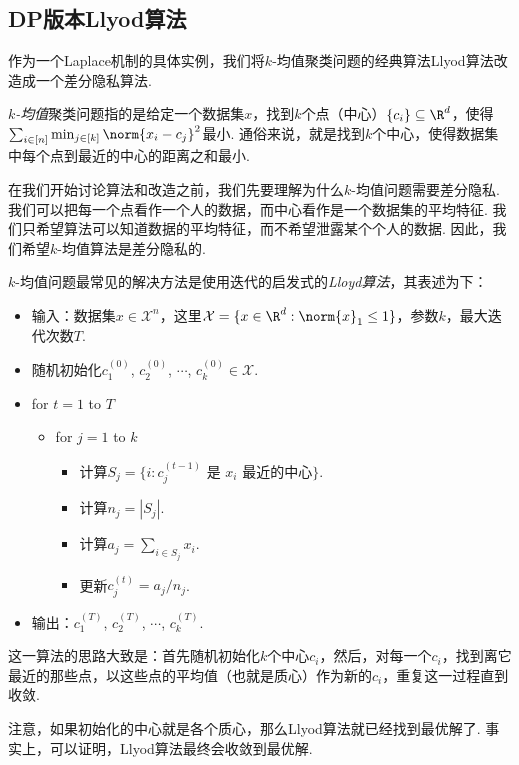 \subsection{DP版本Llyod算法}
作为一个Laplace机制的具体实例，我们将$k$-均值聚类问题的经典算法Llyod算法改造成一个差分隐私算法.

\emph{$k$-均值}聚类问题指的是给定一个数据集$x$，找到$k$个点（中心）$\{c_i\} \subseteq \R^d$，使得$\sum_{i \in [n]} \min_{j\in[k]} \norm{x_i - c_j}^2$最小. 通俗来说，就是找到$k$个中心，使得数据集中每个点到最近的中心的距离之和最小. 

在我们开始讨论算法和改造之前，我们先要理解为什么$k$-均值问题需要差分隐私. 我们可以把每一个点看作一个人的数据，而中心看作是一个数据集的平均特征. 我们只希望算法可以知道数据的平均特征，而不希望泄露某个个人的数据. 因此，我们希望$k$-均值算法是差分隐私的.

$k$-均值问题最常见的解决方法是使用迭代的启发式的\emph{Lloyd算法}，其表述为下：
\begin{itemize}
    \item 输入：数据集$x \in \mathcal X^n$，这里$\mathcal X = \{x \in \R^d : \norm{x}_1 \leq 1 \}$，参数$k$，最大迭代次数$T$.
    \item 随机初始化$c_1^{(0)}$, $c_2^{(0)}$, $\cdots$, $c_k^{(0)} \in \mathcal X$.
    \item for $t=1$ to $T$
    \begin{itemize}
        \item for $j=1$ to $k$
        \begin{itemize}
            \item 计算$S_j = \{i : c_{j}^{(t-1)} \text{ 是\ } x_i \text{ 最近的中心}\}$.
            \item 计算$n_j = |S_j|$.
            \item 计算$a_j = \sum_{i\in S_j} x_i$.
            \item 更新$c_j^{(t)} = a_j/n_j$.
        \end{itemize}
    \end{itemize}
    \item 输出：$c_1^{(T)}$, $c_2^{(T)}$, $\cdots$, $c_k^{(T)}$.
\end{itemize}

这一算法的思路大致是：首先随机初始化$k$个中心$c_i$，然后，对每一个$c_i$，找到离它最近的那些点，以这些点的平均值（也就是质心）作为新的$c_i$，重复这一过程直到收敛.

注意，如果初始化的中心就是各个质心，那么Llyod算法就已经找到最优解了. 事实上，可以证明，Llyod算法最终会收敛到最优解. 


